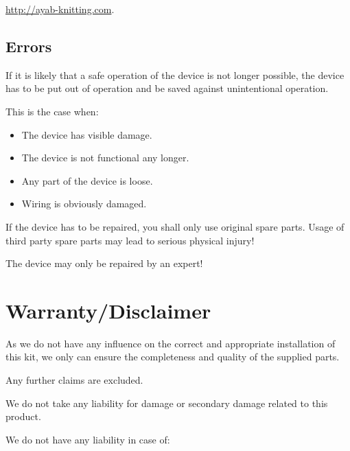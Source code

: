 \documentclass[fleqn,10pt]{SelfArx} %
\begin{document}
\url{http://ayab-knitting.com}.

\subsection*{Errors}

If it is likely that a safe operation of the device is not longer possible, the device has to be put out of operation and be saved against unintentional operation.

This is the case when:

\begin{itemize}[noitemsep] %
\item The device has visible damage.
\item The device is not functional any longer.
\item Any part of the device is loose.
\item Wiring is obviously damaged.
\end{itemize}

If the device has to be repaired, you shall only use original spare parts. Usage of third party spare parts may lead to serious physical injury!

The device may only be repaired by an expert!


\section{Warranty/Disclaimer}

As we do not have any influence on the correct and appropriate installation of this kit, we only can ensure the completeness and quality of the supplied parts.


Any further claims are excluded.

We do not take any liability for damage or secondary damage related to this product.


We do not have any liability in case of:
\end{document}
